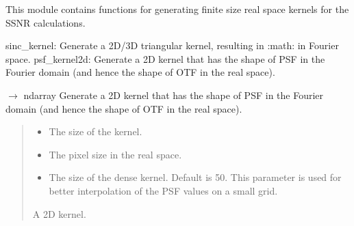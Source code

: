 \documentclass[letterpaper,10pt,english]{sphinxmanual}
\begin{document}
\sphinxAtStartPar
This module contains functions for generating finite size real space kernels for the SSNR calculations.
\begin{description}
\sphinxAtStartPar
sinc\_kernel: Generate a 2D/3D triangular kernel, resulting in :math:  in Fourier space.
psf\_kernel2d: Generate a 2D kernel that has the shape of PSF in the Fourier domain (and hence the shape of OTF in the real space).

\end{description}

\begin{fulllineitems}
\label{\detokenize{source/kernels:kernels.psf_kernel2d}}
\pysigstartsignatures
\pysiglinewithargsret
{}
{\sphinxparamcomma {}\sphinxparamcomma {}}
{{ $\rightarrow$ ndarray}}
\pysigstopsignatures
\sphinxAtStartPar
Generate a 2D kernel that has the shape of PSF in the Fourier domain (and hence the shape of OTF in the real space).
\begin{quote}\begin{description}
\begin{itemize}
\item {} 
\sphinxAtStartPar
{} \textendash{} The size of the kernel.

\item {} 
\sphinxAtStartPar
{} \textendash{} The pixel size in the real space.

\item {} 
\sphinxAtStartPar
{} \textendash{} The size of the dense kernel. Default is 50. This parameter is used for better interpolation of the PSF values on a small grid.

\end{itemize}

\sphinxAtStartPar
A 2D kernel.

\end{description}\end{quote}

\end{fulllineitems}
\end{document}
